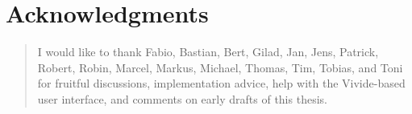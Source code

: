 \begingroup
\let\raggedsection\centering

\chapter*{Acknowledgments}
\label{cha:acknowledgments}
\endgroup
\begin{quotation}
\noindent
I would like to thank Fabio, Bastian, Bert, Gilad, Jan, Jens, Patrick, Robert, Robin, Marcel, Markus, Michael, Thomas, Tim, Tobias, and Toni for fruitful discussions, implementation advice, help with the Vivide-based user interface, and comments on early drafts of this thesis.
\end{quotation}

